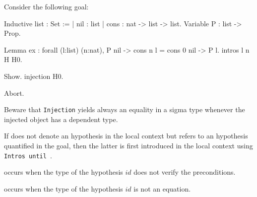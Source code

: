 \Example Consider the following goal:

\begin{coq_example*}
Inductive list : Set :=
  | nil : list
  | cons : nat -> list -> list.
Variable P : list -> Prop.
\end{coq_example*}
\begin{coq_eval}
Lemma ex :
 forall (l:list) (n:nat), P nil -> cons n l = cons 0 nil -> P l.
intros l n H H0.
\end{coq_eval}
\begin{coq_example}
Show.
injection H0.
\end{coq_example}
\begin{coq_eval}
Abort.
\end{coq_eval}

Beware that \texttt{Injection} yields always an equality in a sigma type
whenever the injected object has a dependent type.

\Rem If {\ident} does not denote an hypothesis in the local context
but refers to an hypothesis quantified in the goal, then the
latter is first introduced in the local context using
\texttt{Intros until \ident}.

\begin{ErrMsgs}
\item {\ident}  
  occurs when the type of
  the hypothesis $id$ does not verify the preconditions.
\item {} occurs when the type of the
  hypothesis $id$ is not an equation.
\end{ErrMsgs}


